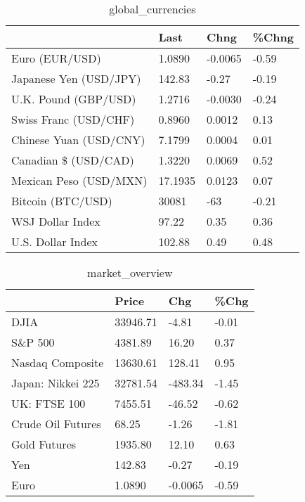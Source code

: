 \documentclass{article}%
\begin{document}
%


\begin{table}[htbp]%
\caption{global\_currencies}%
\centering%
\begin{adjustbox}{width=1\textwidth}%
\begin{tabular}{llll}
\toprule
                       &    Last &    Chng & \%Chng \\
\midrule
        Euro (EUR/USD) &  1.0890 & -0.0065 & -0.59 \\
Japanese Yen (USD/JPY) &  142.83 &   -0.27 & -0.19 \\
  U.K. Pound (GBP/USD) &  1.2716 & -0.0030 & -0.24 \\
 Swiss Franc (USD/CHF) &  0.8960 &  0.0012 &  0.13 \\
Chinese Yuan (USD/CNY) &  7.1799 &  0.0004 &  0.01 \\
  Canadian \$ (USD/CAD) &  1.3220 &  0.0069 &  0.52 \\
Mexican Peso (USD/MXN) & 17.1935 &  0.0123 &  0.07 \\
     Bitcoin (BTC/USD) &   30081 &     -63 & -0.21 \\
      WSJ Dollar Index &   97.22 &    0.35 &  0.36 \\
     U.S. Dollar Index &  102.88 &    0.49 &  0.48 \\
\bottomrule
\end{tabular}
%
\end{adjustbox}%
\end{table}

%


\begin{table}[htbp]%
\caption{market\_overview}%
\centering%
\begin{adjustbox}{width=1\textwidth}%
\begin{tabular}{llll}
\toprule
                  &    Price &     Chg &  \%Chg \\
\midrule
             DJIA & 33946.71 &   -4.81 & -0.01 \\
          S\&P 500 &  4381.89 &   16.20 &  0.37 \\
 Nasdaq Composite & 13630.61 &  128.41 &  0.95 \\
Japan: Nikkei 225 & 32781.54 & -483.34 & -1.45 \\
     UK: FTSE 100 &  7455.51 &  -46.52 & -0.62 \\
Crude Oil Futures &    68.25 &   -1.26 & -1.81 \\
     Gold Futures &  1935.80 &   12.10 &  0.63 \\
              Yen &   142.83 &   -0.27 & -0.19 \\
             Euro &   1.0890 & -0.0065 & -0.59 \\
\bottomrule
\end{tabular}
%
\end{adjustbox}%
\end{table}

%
\end{document}
